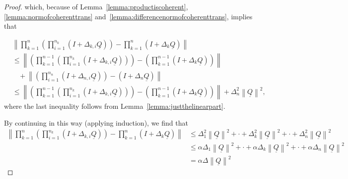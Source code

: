 \documentclass[10pt]{paper}
\newcommand{\lrate}{\underline{Q}}
\newcommand{\norm}[1]{\left\lVert #1 \right\rVert}
\begin{document}
\begin{proof}
\noindent
which, because of Lemma~\ref{lemma:productiscoherent}, \ref{lemma:normofcoherenttrans} and~\ref{lemma:differencenormofcoherenttrans}, implies that

\begin{align*}
&\norm{\prod_{k=1}^n\left(\prod_{i=1}^{n_k}(I+\Delta_{k,i}\lrate)\right)
-
\prod_{k=1}^n(I+\Delta_k\lrate)
}\\
&\leq\norm{
\left(
\prod_{k=1}^{n-1}\left(\prod_{i=1}^{n_k}(I+\Delta_{k,i}\lrate)\right)
\right)
-
\left(\prod_{k=1}^{n-1}(I+\Delta_k\lrate)\right)
}\\
&~~~~+\norm{
\left(\prod_{i=1}^{n_n}(I+\Delta_{n,i}\lrate)\right)
-
(I+\Delta_n\lrate)
}\\
&\leq
\norm{
\left(
\prod_{k=1}^{n-1}\left(\prod_{i=1}^{n_k}(I+\Delta_{k,i}\lrate)\right)
\right)
-
\left(\prod_{k=1}^{n-1}(I+\Delta_k\lrate)\right)
}
+
\Delta_n^2\norm{\lrate}^2,
\end{align*}
where the last inequality follows from Lemma~\ref{lemma:justthelinearpart}.

By continuing in this way (applying induction), we find that
\begin{align*}
\norm{\prod_{k=1}^n\left(\prod_{i=1}^{n_k}(I+\Delta_{k,i}\lrate)\right)
-
\prod_{k=1}^n(I+\Delta_k\lrate)
}
&\leq
\Delta_1^2\norm{\lrate}^2+\cdot+\Delta_k^2\norm{\lrate}^2+\cdot
+
\Delta_n^2\norm{\lrate}^2\\
&\leq
\alpha\Delta_1\norm{\lrate}^2+\cdot+\alpha\Delta_k\norm{\lrate}^2+\cdot
+
\alpha\Delta_n\norm{\lrate}^2\\
&=
\alpha\Delta\norm{\lrate}^2
\end{align*}


\end{proof}
\end{document}
